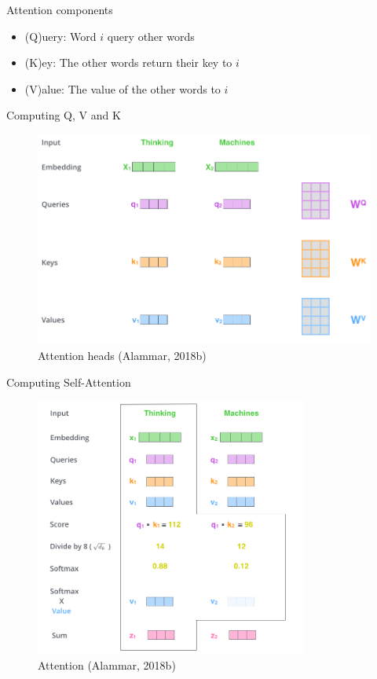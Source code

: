 \documentclass[10pt]{beamer}
\begin{document}
\begin{frame}{Attention components}

\begin{itemize}
\item (Q)uery: Word $i$ query other words
\item (K)ey: The other words return their key to $i$
\item (V)alue: The value of the other words to $i$
\end{itemize}
\end{frame}


\begin{frame}{Computing Q, V and K}

\begin{figure}[h]
\centering
\includegraphics[width=1\textwidth]{fig/alammar_transformer_self_attention_vectors.png}
\caption{Attention heads (Alammar, 2018b)}
\end{figure}

\end{frame}

\begin{frame}{Computing Self-Attention}

\begin{figure}[h]
\centering
\includegraphics[width=0.8\textwidth]{fig/alammar_self-attention-output.png}
\caption{Attention (Alammar, 2018b)}
\end{figure}

\end{frame}
\end{document}
